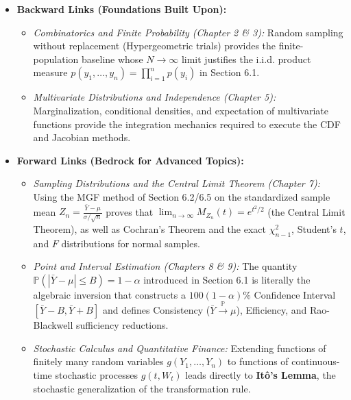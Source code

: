 \documentclass[11pt, letterpaper]{article}
\theoremstyle{definition}
\theoremstyle{remark}
\newcommand{\Prob}{\mathbb{P}}
\begin{document}
\begin{itemize}
    \item \textbf{Backward Links (Foundations Built Upon):}
    \begin{itemize}
        \item \emph{Combinatorics and Finite Probability (Chapter 2 \& 3):} Random sampling without replacement (Hypergeometric trials) provides the finite-population baseline whose $N \to \infty$ limit justifies the i.i.d. product measure $p(y_1, \dots, y_n) = \prod_{i=1}^n p(y_i)$ in Section 6.1.
        \item \emph{Multivariate Distributions and Independence (Chapter 5):} Marginalization, conditional densities, and expectation of multivariate functions provide the integration mechanics required to execute the CDF and Jacobian methods.
    \end{itemize}
    \item \textbf{Forward Links (Bedrock for Advanced Topics):}
    \begin{itemize}
        \item \emph{Sampling Distributions and the Central Limit Theorem (Chapter 7):} Using the MGF method of Section 6.2/6.5 on the standardized sample mean $Z_n = \frac{\bar{Y} - \mu}{\sigma/\sqrt{n}}$ proves that $\lim_{n \to \infty} M_{Z_n}(t) = e^{t^2/2}$ (the Central Limit Theorem), as well as Cochran's Theorem and the exact $\chi^2_{n-1}$, Student's $t$, and $F$ distributions for normal samples.
        \item \emph{Point and Interval Estimation (Chapters 8 \& 9):} The quantity $\Prob(|\bar{Y} - \mu| \le B) = 1 - \alpha$ introduced in Section 6.1 is literally the algebraic inversion that constructs a $100(1-\alpha)\%$ Confidence Interval $[\bar{Y} - B, \bar{Y} + B]$ and defines Consistency ($\bar{Y} \xrightarrow{\Prob} \mu$), Efficiency, and Rao-Blackwell sufficiency reductions.
        \item \emph{Stochastic Calculus and Quantitative Finance:} Extending functions of finitely many random variables $g(Y_1, \dots, Y_n)$ to functions of continuous-time stochastic processes $g(t, W_t)$ leads directly to \textbf{It\^o's Lemma}, the stochastic generalization of the transformation rule.
    \end{itemize}
\end{itemize}

\newpage

\end{document}
